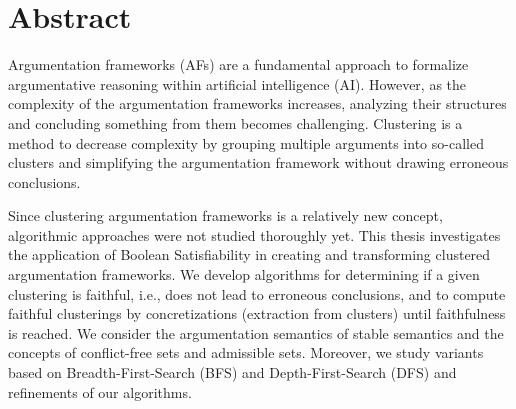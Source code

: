 \documentclass[twoside,openright]{scrreprt}
\begin{document}







\thesisdate[ ]{\today}







\printthesistitle

% 


\chapter*{Abstract}
Argumentation frameworks (AFs) are a fundamental approach to formalize argumentative reasoning within artificial intelligence (AI). However, as the complexity of the argumentation frameworks increases, analyzing their structures and concluding something from them becomes challenging. Clustering is a method to decrease complexity by grouping multiple arguments into so-called clusters and simplifying the argumentation framework without drawing erroneous conclusions.

Since clustering argumentation frameworks is a relatively new concept, algorithmic approaches were not studied thoroughly yet. This thesis investigates the application of Boolean Satisfiability in creating and transforming clustered argumentation frameworks. We develop algorithms for determining if a given clustering is faithful, i.e., does not lead to erroneous conclusions, and to compute faithful clusterings by concretizations (extraction from clusters) until faithfulness is reached. We consider the argumentation semantics of stable semantics and the concepts of conflict-free sets and admissible sets. Moreover, we study variants based on Breadth-First-Search (BFS) and Depth-First-Search (DFS) and refinements of our algorithms.
\end{document}
